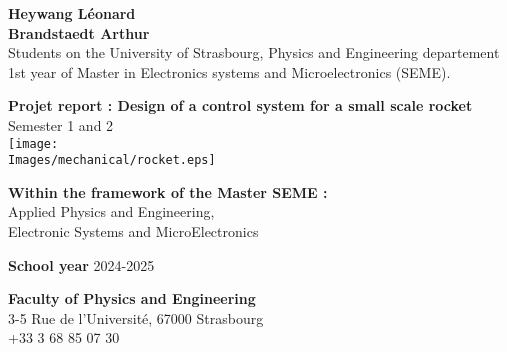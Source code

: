 \begin{titlepage}
    \raggedright
    \textbf{Heywang Léonard}	\\
    \textbf{Brandstaedt Arthur}  \\
    Students on the University of Strasbourg, Physics and Engineering departement\\
    1st year of Master in Electronics systems and Microelectronics (SEME).

    \raggedleft

    \centering
    \vspace{2.5cm}

    \huge
    \textbf{Projet report : Design of a control system for a small scale rocket}\\
    Semester 1 and 2\\
    \vspace{1cm}
    \texttt{[image: \\Images/mechanical/rocket.eps]}

    \raggedright
    \normalsize
    \vspace{2cm}
    \textbf{Within the framework of the Master SEME :}\\
    Applied Physics and Engineering, \\
    Electronic Systems and MicroElectronics

    \vspace{1.5cm}
    \textbf{School year} 2024-2025

    \vspace{1.5cm}
    \textbf{Faculty of Physics and Engineering}\\
    3-5 Rue de l'Université, 67000 Strasbourg\\
    +33 3 68 85 07 30

    \vspace{2cm}
    \centering
    \begin{figure}[!ht]%
        \centering
        \qquad
    \end{figure}
\end{titlepage}
